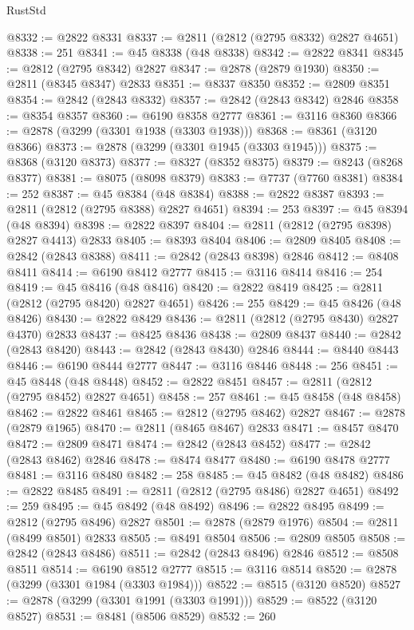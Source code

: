 \begin{lexlean}{RustStd}
\begin{coremodule}
@8332 := @2822 @8331
@8337 := @2811 (@2812 (@2795 @8332) @2827 @4651)
@8338 := 251
@8341 := @45 @8338 (@48 @8338)
@8342 := @2822 @8341
@8345 := @2812 (@2795 @8342) @2827
@8347 := @2878 (@2879 @1930)
@8350 := @2811 (@8345 @8347) @2833
@8351 := @8337 @8350
@8352 := @2809 @8351
@8354 := @2842 (@2843 @8332)
@8357 := @2842 (@2843 @8342) @2846
@8358 := @8354 @8357
@8360 := @6190 @8358 @2777
@8361 := @3116 @8360
@8366 := @2878 (@3299 (@3301 @1938 (@3303 @1938)))
@8368 := @8361 (@3120 @8366)
@8373 := @2878 (@3299 (@3301 @1945 (@3303 @1945)))
@8375 := @8368 (@3120 @8373)
@8377 := @8327 (@8352 @8375)
@8379 := @8243 (@8268 @8377)
@8381 := @8075 (@8098 @8379)
@8383 := @7737 (@7760 @8381)
@8384 := 252
@8387 := @45 @8384 (@48 @8384)
@8388 := @2822 @8387
@8393 := @2811 (@2812 (@2795 @8388) @2827 @4651)
@8394 := 253
@8397 := @45 @8394 (@48 @8394)
@8398 := @2822 @8397
@8404 := @2811 (@2812 (@2795 @8398) @2827 @4413) @2833
@8405 := @8393 @8404
@8406 := @2809 @8405
@8408 := @2842 (@2843 @8388)
@8411 := @2842 (@2843 @8398) @2846
@8412 := @8408 @8411
@8414 := @6190 @8412 @2777
@8415 := @3116 @8414
@8416 := 254
@8419 := @45 @8416 (@48 @8416)
@8420 := @2822 @8419
@8425 := @2811 (@2812 (@2795 @8420) @2827 @4651)
@8426 := 255
@8429 := @45 @8426 (@48 @8426)
@8430 := @2822 @8429
@8436 := @2811 (@2812 (@2795 @8430) @2827 @4370) @2833
@8437 := @8425 @8436
@8438 := @2809 @8437
@8440 := @2842 (@2843 @8420)
@8443 := @2842 (@2843 @8430) @2846
@8444 := @8440 @8443
@8446 := @6190 @8444 @2777
@8447 := @3116 @8446
@8448 := 256
@8451 := @45 @8448 (@48 @8448)
@8452 := @2822 @8451
@8457 := @2811 (@2812 (@2795 @8452) @2827 @4651)
@8458 := 257
@8461 := @45 @8458 (@48 @8458)
@8462 := @2822 @8461
@8465 := @2812 (@2795 @8462) @2827
@8467 := @2878 (@2879 @1965)
@8470 := @2811 (@8465 @8467) @2833
@8471 := @8457 @8470
@8472 := @2809 @8471
@8474 := @2842 (@2843 @8452)
@8477 := @2842 (@2843 @8462) @2846
@8478 := @8474 @8477
@8480 := @6190 @8478 @2777
@8481 := @3116 @8480
@8482 := 258
@8485 := @45 @8482 (@48 @8482)
@8486 := @2822 @8485
@8491 := @2811 (@2812 (@2795 @8486) @2827 @4651)
@8492 := 259
@8495 := @45 @8492 (@48 @8492)
@8496 := @2822 @8495
@8499 := @2812 (@2795 @8496) @2827
@8501 := @2878 (@2879 @1976)
@8504 := @2811 (@8499 @8501) @2833
@8505 := @8491 @8504
@8506 := @2809 @8505
@8508 := @2842 (@2843 @8486)
@8511 := @2842 (@2843 @8496) @2846
@8512 := @8508 @8511
@8514 := @6190 @8512 @2777
@8515 := @3116 @8514
@8520 := @2878 (@3299 (@3301 @1984 (@3303 @1984)))
@8522 := @8515 (@3120 @8520)
@8527 := @2878 (@3299 (@3301 @1991 (@3303 @1991)))
@8529 := @8522 (@3120 @8527)
@8531 := @8481 (@8506 @8529)
@8532 := 260

\end{coremodule}
\end{lexlean}
